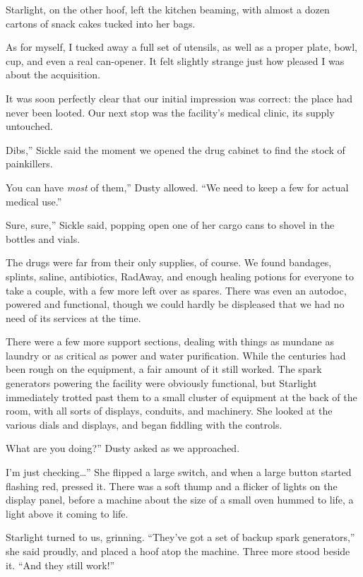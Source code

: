 Starlight, on the other hoof, left the kitchen beaming, with almost a dozen cartons of snack cakes tucked into her bags.

As for myself, I tucked away a full set of utensils, as well as a proper plate, bowl, cup, and even a real can-opener. It felt slightly strange just how pleased I was about the acquisition.

It was soon perfectly clear that our initial impression was correct: the place had never been looted. Our next stop was the facility’s medical clinic, its supply untouched.

\leavevmode{}Dibs,” Sickle said the moment we opened the drug cabinet to find the stock of painkillers.

\leavevmode{}You can have \textit{most} of them,” Dusty allowed. “We need to keep a few for actual medical use.”

\leavevmode{}Sure, sure,” Sickle said, popping open one of her cargo cans to shovel in the bottles and vials.

The drugs were far from their only supplies, of course. We found bandages, splints, saline, antibiotics, RadAway, and enough healing potions for everyone to take a couple, with a few more left over as spares. There was even an autodoc, powered and functional, though we could hardly be displeased that we had no need of its services at the time.

There were a few more support sections, dealing with things as mundane as laundry or as critical as power and water purification. While the centuries had been rough on the equipment, a fair amount of it still worked. The spark generators powering the facility were obviously functional, but Starlight immediately trotted past them to a small cluster of equipment at the back of the room, with all sorts of displays, conduits, and machinery. She looked at the various dials and displays, and began fiddling with the controls.

\leavevmode{}What are you doing?” Dusty asked as we approached.

\leavevmode{}I’m just checking…” She flipped a large switch, and when a large button started flashing red, pressed it. There was a soft thump and a flicker of lights on the display panel, before a machine about the size of a small oven hummed to life, a light above it coming to life.

Starlight turned to us, grinning. “They’ve got a set of backup spark generators,” she said proudly, and placed a hoof atop the machine. Three more stood beside it. “And they still work!”

